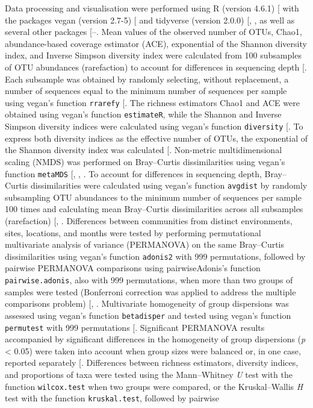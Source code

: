 \documentclass[
  12 pt,
]{article}
\begin{document}
Data processing and visualisation were performed using R (version 4.6.1) {[}\citeproc{ref-R-base}{61}{]} with the packages vegan (version 2.7-5) {[}\citeproc{ref-R-vegan}{62}{]} and tidyverse (version 2.0.0) {[}, \citeproc{ref-tidyverse2019}{64}{]}, as well as several other packages {[}--\citeproc{ref-tinytex2019}{88}{]}. Mean values of the observed number of OTUs, Chao1, abundance-based coverage estimator (ACE), exponential of the Shannon diversity index, and Inverse Simpson diversity index were calculated from 100 subsamples of OTU abundances (rarefaction) to account for differences in sequencing depth {[}\citeproc{ref-Schloss2024}{89}{]}. Each subsample was obtained by randomly selecting, without replacement, a number of sequences equal to the minimum number of sequences per sample using vegan's function \texttt{rrarefy} {[}\citeproc{ref-R-vegan}{62}{]}. The richness estimators Chao1 and ACE were obtained using vegan's function \texttt{estimateR}, while the Shannon and Inverse Simpson diversity indices were calculated using vegan's function \texttt{diversity} {[}\citeproc{ref-R-vegan}{62}{]}. To express both diversity indices as the effective number of OTUs, the exponential of the Shannon diversity index was calculated {[}\citeproc{ref-Jost2006}{90}{]}. Non-metric multidimensional scaling (NMDS) was performed on Bray--Curtis dissimilarities using vegan's function \texttt{metaMDS} {[}, , \citeproc{ref-Legendre2012}{92}{]}. To account for differences in sequencing depth, Bray--Curtis dissimilarities were calculated using vegan's function \texttt{avgdist} by randomly subsampling OTU abundances to the minimum number of sequences per sample 100 times and calculating mean Bray--Curtis dissimilarities across all subsamples (rarefaction) {[}, \citeproc{ref-Schloss2024}{89}{]}. Differences between communities from distinct environments, sites, locations, and months were tested by performing permutational multivariate analysis of variance (PERMANOVA) on the same Bray--Curtis dissimilarities using vegan's function \texttt{adonis2} with 999 permutations, followed by pairwise PERMANOVA comparisons using pairwiseAdonis's function \texttt{pairwise.adonis}, also with 999 permutations, when more than two groups of samples were tested (Bonferroni correction was applied to address the multiple comparisons problem) {[}, \citeproc{ref-R-pairwiseAdonis}{76}{]}. Multivariate homogeneity of group dispersions was assessed using vegan's function \texttt{betadisper} and tested using vegan's function \texttt{permutest} with 999 permutations {[}\citeproc{ref-R-vegan}{62}{]}. Significant PERMANOVA results accompanied by significant differences in the homogeneity of group dispersions (\emph{p} \textless{} 0.05) were taken into account when group sizes were balanced or, in one case, reported separately {[}\citeproc{ref-Anderson2013}{93}{]}. Differences between richness estimators, diversity indices, and proportions of taxa were tested using the Mann--Whitney \emph{U} test with the function \texttt{wilcox.test} when two groups were compared, or the Kruskal--Wallis \emph{H} test with the function \texttt{kruskal.test}, followed by pairwise 
\end{document}
